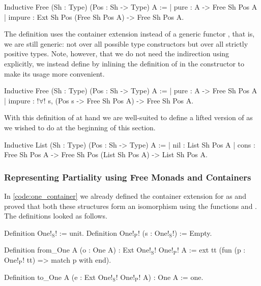\begin{coqcode}
Inductive Free (Sh : Type) (Pos : Sh -> Type) A :=
| pure   : A -> Free Sh Pos A
| impure : Ext Sh Pos (Free Sh Pos A) -> Free Sh Pos A.
\end{coqcode}

The definition uses the container extension instead of a generic functor , that is, we are still generic: not over all possible type constructors but over all strictly positive types.
Note, however, that we do not need the indirection using  explicitly, we instead define  by inlining the definition of  in the constructor  to make its usage more convenient.

\begin{coqcode}
Inductive Free (Sh : Type) (Pos : Sh -> Type) A :=
| pure   : A -> Free Sh Pos A
| impure : !$\forall$! s, (Pos s -> Free Sh Pos A) -> Free Sh Pos A.
\end{coqcode}

With this definition of  at hand we are well\--suited to define a lifted version of  as we wished to do at the beginning of this section.

\begin{coqcode}
Inductive List (Sh : Type) (Pos : Sh -> Type) A :=
| nil : List Sh Pos A
| cons : Free Sh Pos A -> Free Sh Pos (List Sh Pos A) -> List Sh Pos A.
\end{coqcode}

\subsubsection{Representing Partiality using Free Monads and Containers}
\label{subsub:partiality_container}

In \autoref{code:one_container} we already defined the container extension for  as  and proved that both these structures form an isomorphism using the functions  and .
The definitions looked as follows.

\begin{coqcode}
Definition One!$_\text{S}$! := unit.
Definition One!$_\text{P}$! (s : One!$_\text{S}$!) := Empty.

Definition from_One A (o : One A) : Ext One!$_\text{S}$! One!$_\text{P}$! A :=
  ext tt (fun (p : One!$_\text{P}$! tt) => match p with end).

Definition to_One A (e : Ext One!$_\text{S}$! One!$_\text{P}$! A) : One A :=
  one.
\end{coqcode}

